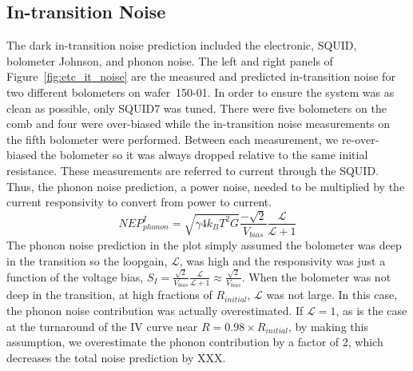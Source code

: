 \subsection{In-transition Noise}
\label{sec:in_transition_noise}

The dark in-transition noise prediction included the electronic, \ac{SQUID}, bolometer Johnson, and phonon noise. 
The left and right panels of Figure~\ref{fig:etc_it_noise} are the measured and predicted in-transition noise for two different bolometers on wafer~150-01. 
In order to ensure the system was as clean as possible, only \ac{SQUID}7 was tuned. 
There were five bolometers on the comb and four were over-biased while the in-transition noise measurements on the fifth bolometer were performed. 
Between each measurement, we re-over-biased the bolometer so it was always dropped relative to the same initial resistance. 
These measurements are referred to current through the \ac{SQUID}. 
Thus, the phonon noise prediction, a power noise, needed to be multiplied by the current responsivity to convert from power to current. 
\begin{equation}
NEP_{phonon}^{I} = \sqrt{\gamma 4 k_{B} T^2 G} \frac{-\sqrt{2}}{V_{bias}}\frac{\mathscr{L}}{\mathscr{L}+1}
\end{equation}
The phonon noise prediction in the plot simply assumed the bolometer was deep in the transition so the loopgain, $\mathscr{L}$, was high and the responsivity was just a function of the voltage bias, $S_{I} = \frac{\sqrt{2}}{V_{bias}} \frac{\mathscr{L}}{\mathscr{L}+1} \approx \frac{\sqrt{2}}{V_{bias}} $. 
When the bolometer was not deep in the transition, at high fractions of $R_{initial}$, $\mathscr{L}$ was not large.
In this case, the phonon noise contribution was actually overestimated. 
If $\mathscr{L} = 1$, as is the case at the turnaround of the IV curve near $R = 0.98 \times R_{initial}$, by making this assumption, we overestimate the phonon contribution by a factor of 2, which decreases the total noise prediction by XXX. 
 

